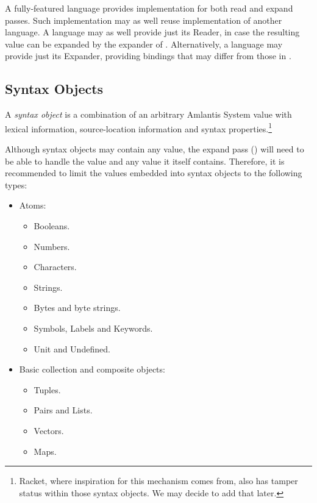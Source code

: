 A fully-featured language provides implementation for both read and expand passes. Such implementation may as well reuse implementation of another language. A language may as well provide just its Reader, in case the resulting value can be expanded by the expander of \AmlBase. Alternatively, a language may provide just its Expander, providing bindings that may differ from those in \AmlBase.





\subsection{Syntax Objects}
\label{subsec:environment-language-syntax-objects}

A {\em syntax object} is a combination of an arbitrary Amlantis System value with lexical information, source-location information and syntax properties.\footnote{Racket, where inspiration for this mechanism comes from, also has tamper status within those syntax objects. We may decide to add that later.}

Although syntax objects may contain any value, the expand pass () will need to be able to handle the value and any value it itself contains. Therefore, it is recommended to limit the values embedded into syntax objects to the following types:

\begin{itemize}
  \item Atoms:
  \begin{itemize}
    \item Booleans.
    \item Numbers.
    \item Characters.
    \item Strings.
    \item Bytes and byte strings.
    \item Symbols, Labels and Keywords.
    \item Unit and Undefined.
  \end{itemize}
  \item Basic collection and composite objects:
  \begin{itemize}
    \item Tuples.
    \item Pairs and Lists.
    \item Vectors.
    \item Maps.
  \end{itemize}
\end{itemize}





